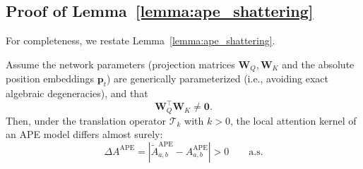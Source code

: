 \subsection{Proof of Lemma~\ref{lemma:ape_shattering}}
\label{app:proof-ape-shattering}

For completeness, we restate Lemma~\ref{lemma:ape_shattering}.

Assume the network parameters (projection matrices $\mathbf{W}_Q, \mathbf{W}_K$ and the absolute position embeddings $\mathbf{p}_t$) are generically parameterized (i.e., avoiding exact algebraic degeneracies), and that
\begin{equation}
\mathbf{W}_Q^\top \mathbf{W}_K \neq \mathbf{0}.
\end{equation}
Then, under the translation operator $\mathcal{T}_k$ with $k>0$, the local attention kernel of an APE model differs almost surely:
\begin{equation}
\Delta A^{\mathrm{APE}} = |\tilde{A}_{a,b}^{\mathrm{APE}} - A_{a,b}^{\mathrm{APE}}| > 0
\qquad \text{a.s.}
\end{equation}

